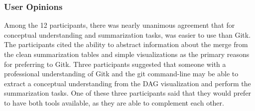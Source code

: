 \subsubsection{User Opinions}
\label{sub:user_opinions}

Among the 12 participants, there was nearly unanimous agreement that for
conceptual understanding and summarization tasks, \tool was easier to
use than Gitk. The participants cited the ability to abstract
information about the merge from the clean summarization tables and
simple visualizations as the primary reasons for preferring \tool to
Gitk. Three participants suggested that someone with a professional
understanding of Gitk and the git command-line may be able to extract a
conceptual understanding from the DAG visualization and perform the
summarization tasks. One of these three participants said that they
would prefer to have both tools available, as they are able to
complement each other.


